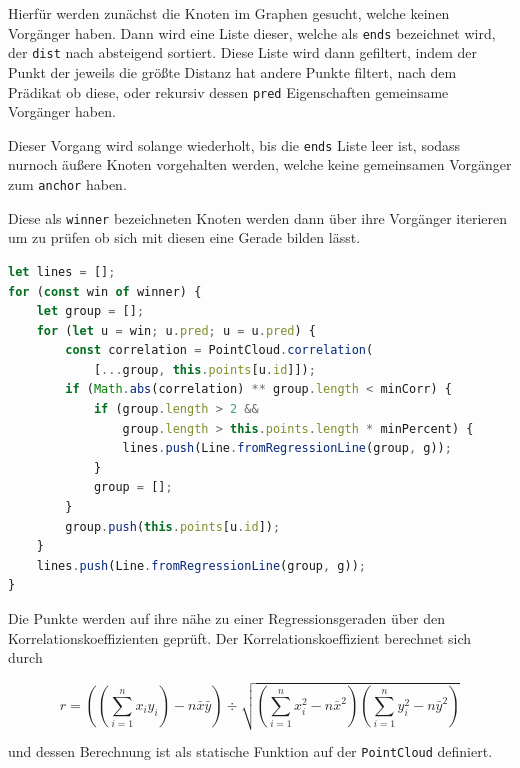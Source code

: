 Hierfür werden zunächst die Knoten im Graphen gesucht, welche keinen Vorgänger haben.
Dann wird eine Liste dieser, welche als \lstinline{ends} bezeichnet wird, der \lstinline{dist} nach absteigend sortiert.
Diese Liste wird dann gefiltert, indem der Punkt der jeweils die grö{\ss}te Distanz hat andere Punkte filtert, nach dem Prädikat ob diese, oder rekursiv dessen \lstinline{pred} Eigenschaften gemeinsame Vorgänger haben.

Dieser Vorgang wird solange wiederholt, bis die \lstinline{ends} Liste leer ist, sodass nurnoch äu{\ss}ere Knoten vorgehalten werden, welche keine gemeinsamen Vorgänger zum \lstinline{anchor} haben.

Diese als \lstinline{winner} bezeichneten Knoten werden dann über ihre Vorgänger iterieren um zu prüfen ob sich mit diesen eine Gerade bilden lässt.

\begin{lstlisting}[language=JavaScript, caption={Bestimmung der äu{\ss}ersten Knoten zur Bestimmung von Geraden durch den Korrelationskoeffizienten in der \lstinline{groupsByCorrelation} Funktion innerhalb der \lstinline{Dijkstra} Klasse.}, label={lst:dijkstra_correlation_part2}]
let lines = [];
for (const win of winner) {
    let group = [];
    for (let u = win; u.pred; u = u.pred) {
        const correlation = PointCloud.correlation(
            [...group, this.points[u.id]]);
        if (Math.abs(correlation) ** group.length < minCorr) {
            if (group.length > 2 &&
                group.length > this.points.length * minPercent) {
                lines.push(Line.fromRegressionLine(group, g));
            }
            group = [];
        }
        group.push(this.points[u.id]);
    }
    lines.push(Line.fromRegressionLine(group, g));
}
\end{lstlisting}

Die Punkte werden auf ihre nähe zu einer Regressionsgeraden über den Korrelationskoeffizienten geprüft.
Der Korrelationskoeffizient berechnet sich durch~\cite{Papula2014}

\begin{equation}
    r = \left(\left(\sum_{i=1}^n x_i y_i\right) - n \bar{x} \bar{y}\right) \div \sqrt{\left(\sum_{i=1}^n x_i^2 - n\bar{x}^2\right)\left(\sum_{i=1}^n y_i^2 - n \bar{y}^2\right)}
    \label{eq:korrelationskoeffizient}
\end{equation}

und dessen Berechnung ist als statische Funktion auf der \lstinline{PointCloud} definiert.

